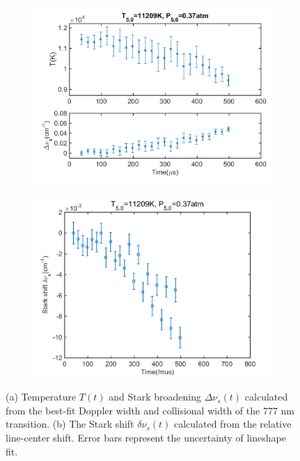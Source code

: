 \documentclass[12pt]{iopart}
\begin{document}
\begin{figure}[h]
  \centering
    \begin{subfigure}[b]{0.45\textwidth}
     \includegraphics[width=\textwidth]{11209K_037atm_T_vs_777.png}
    \caption{\label{fig:Tdoppler_vs_777}}  
      \end{subfigure} %
    \begin{subfigure}[b]{0.45\textwidth}
     \includegraphics[width=\textwidth]{11209K_037atm_stark_shift_777.png}
      \caption{\label{fig:stark_shift_time_history_777} }
      \end{subfigure}
    \caption{\label{fig:broadening_and_shift_777} (a)  Temperature $T(t)$ and Stark broadening $\Delta\nu_s(t)$  calculated from the best-fit Doppler width and collisional width of the 777 nm transition. (b) The Stark shift $\delta\nu_s(t)$ calculated from the relative line-center shift. Error bars represent the uncertainty of lineshape fit.}
\end{figure}
\end{document}
